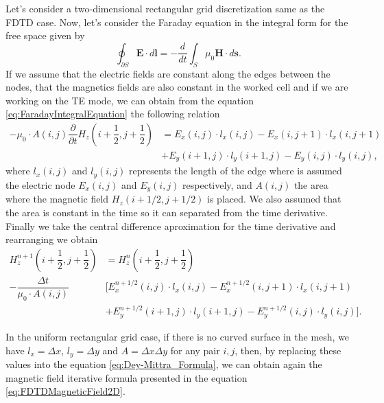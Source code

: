 \documentclass[12pt, oneside]{book}
\begin{document}
Let's consider a two-dimensional rectangular grid discretization same as the FDTD case. Now, let's consider the Faraday equation in the integral form for the free space given by
\begin{equation}
    \oint_{\partial S} \boldsymbol{E} \cdot d \boldsymbol{l} = -\dfrac{d}{dt} \int_{S} \mu_0 \boldsymbol{H} \cdot d\boldsymbol{s}.
    \label{eq:FaradayIntegralEquation}
\end{equation}
If we assume that the electric fields are constant along the edges between the nodes, that the magnetics fields are also constant in the worked cell and if we are working on the TE mode, we can obtain from the equation \ref{eq:FaradayIntegralEquation} the following relation
\begin{equation}
\begin{aligned}
    -\mu_0 \cdot A(i,j)\dfrac{\partial}{\partial t} H_z\left( i + \dfrac{1}{2}, j + \dfrac{1}{2} \right) &= E_x(i,j)\cdot l_x(i,j) - E_x(i,j+1) \cdot l_x(i,j+1) \\
                                                                                                   &+ E_y(i+1,j)\cdot l_y(i+1,j) - E_y(i,j)\cdot l_y(i,j),  
\end{aligned}
\label{eq:FaradayIntegralEquationRectangularGrid}
\end{equation}
where $l_x(i,j)$ and $l_y(i,j)$ represents the length of the edge where is assumed the electric node $E_x(i,j)$ and $E_y(i,j)$ respectively, and $A(i,j)$ the area where the magnetic field $H_z (i + 1/2, j + 1/2)$ is placed. We also assumed that the area is constant in the time so it can separated from the time derivative. Finally we take the central difference aproximation for the time derivative and rearranging we obtain
\begin{equation}
    \begin{aligned}
        H_z^{n + 1}\left( i + \dfrac{1}{2}, j + \dfrac{1}{2} \right) &= H_z^{n}\left( i + \dfrac{1}{2}, j + \dfrac{1}{2} \right)  \\
        - \dfrac{\Delta t}{\mu_0 \cdot A(i,j)} & \big[ E^{n + 1/2}_x(i,j)\cdot l_x(i,j)- E^{n + 1/2}_x(i,j+1)\cdot l_x(i,j+1)  \\
                                                                       &+  E^{n + 1/2}_y(i+1,j)\cdot l_y(i+1,j) - E^{n + 1/2}_y(i,j)\cdot l_y(i,j)\big].  
    \end{aligned}
\label{eq:Dey-Mittra_Formula}
\end{equation}

In the uniform rectangular grid case, if there is no curved surface in the mesh, we have $l_x = \Delta x$, $l_y = \Delta y$ and $A = \Delta x \Delta y$ for any pair $i,j$, then, by replacing these values into the equation \ref{eq:Dey-Mittra_Formula}, we can obtain again the magnetic field iterative formula presented in the equation \ref{eq:FDTDMagneticField2D}.
\end{document}
